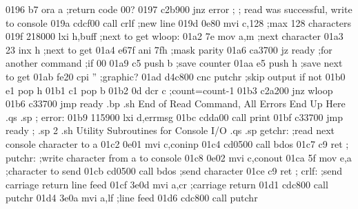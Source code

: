 0196 b7                           ora    a         ;return code 00?
0197 c2b900                       jnz    error
                         ;
                         ;        read was successful, write to console
019a cdcf00                       call   crlf      ;new line
019d 0e80                         mvi    c,128     ;max 128 characters
019f 218000                       lxi    h,buff    ;next to get
                         wloop:
01a2 7e                           mov    a,m       ;next character
01a3 23                           inx    h         ;next to get
01a4 e67f                         ani    7fh       ;mask parity
01a6 ca3700                       jz     ready     ;for another command
                                                   ;if 00
01a9 c5                           push   b         ;save counter
01aa e5                           push   h         ;save next to get
01ab fe20                         cpi    ''        ;graphic?
01ad d4c800                       cnc    putchr    ;skip output if not
01b0 e1                           pop    h
01b1 c1                           pop    b
01b2 0d                           dcr    c         ;count=count-1
01b3 c2a200                       jnz    wloop
01b6 c33700                       jmp    ready
.bp
.sh
                          End of Read Command, All Errors End Up Here
.qs
.sp
                         ;
                         error:
01b9 115900                       lxi    d,errmsg
01bc cdda00                       call   print
01bf c33700                       jmp    ready
                         ;
.sp 2
.sh
                          Utility Subroutines for Console I/O
.qs
.sp
                         getchr:
                                  ;read next console character to a
01c2 0e01                         mvi    c,coninp
01c4 cd0500                       call   bdos
01c7 c9                           ret
                         ;
                         putchr:
                                  ;write character from a to console
01c8 0e02                         mvi    c,conout
01ca 5f                           mov    e,a       ;character to send
01cb cd0500                       call   bdos      ;send character
01ce c9                           ret
                         ;
                         crlf:
                                  ;send carriage return line feed
01cf 3e0d                         mvi    a,cr      ;carriage return
01d1 cdc800                       call   putchr    
01d4 3e0a                         mvi    a,lf      ;line feed
01d6 cdc800                       call   putchr
